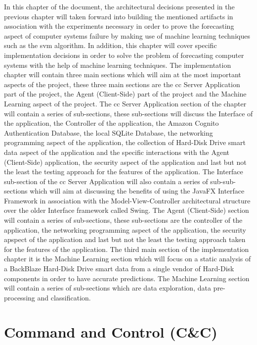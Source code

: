 In this chapter of the document, the architectural decisions presented in the previous chapter will taken
forward into building the mentioned artifacts in association with the experiments necessary in order to
prove the forecasting aspect of computer systems failure by making use of machine learning techniques
such as the \acrfull{svm} algorithm. In addition, this chapter will cover specific implementation
decisions in order to solve the problem of forecasting computer systems with the help of machine
learning techniques. The implementation chapter will contain three main sections which will aim
at the most important aspects of the project, these three main sections are the \acrfull{cc} Server
Application part of the project, the Agent (Client-Side) part of the project and the Machine Learning
aspect of the project. The \acrfull{cc} Server Application section of the chapter will contain a series
of sub-sections, these sub-sections will discuss the Interface of the application, the Controller of the
application, the Amazon Cognito Authentication Database, the local SQLite Database, the networking programming
aspect of the application, the collection of Hard-Disk Drive \acrfull{smart} data aspect of the application and the
specific interactions with the Agent (Client-Side) application, the security aspect of the application
and last but not the least the testing approach for the features of the application. The Interface sub-section
of the \acrfull{cc} Server Application will also contain a series of sub-sub-sections which will aim at
discussing the benefits of using the JavaFX Interface Framework in association with the Model-View-Controller
architectural structure over the older Interface framework called Swing. The Agent (Client-Side) section will
contain a series of sub-sections, these sub-sections are the controller of the application, the networking
programming aspect of the application, the security apspect of the application and last but not the least
the testing approach taken for the features of the application. The third main section of the implementation
chapter it is the Machine Learning section which will focus on a static analysis of a BackBlaze Hard-Disk
Drive \acrfull{smart} data from a single vendor of Hard-Disk components in order to have accurate predictions.
The Machine Learning section will contain a series of sub-sections which are data exploration, data pre-processing
and classification.

\section{Command and Control (C\&C)}

